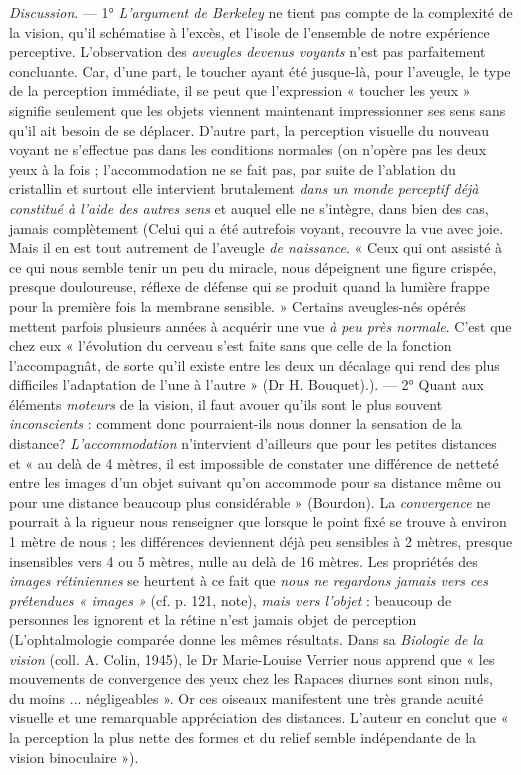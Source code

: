 {{\it Discussion}. — 1° {\it L'argument de Berkeley} ne tient pas compte de la
complexité de la vision, qu’il schématise à l'excès, et l’isole de l’ensemble
de notre expérience perceptive. L'observation des {\it aveugles devenus voyants}
n'est pas parfaitement concluante. Car, d’une part, le toucher ayant été
jusque-là, pour l’aveugle, le type de la perception immédiate, il se peut
que l'expression « toucher les yeux » signifie seulement que les objets
viennent maintenant impressionner ses sens sans qu'il ait besoin de se
déplacer. D'autre part, la perception visuelle du nouveau voyant ne s’effectue
pas dans les conditions normales (on n’opère pas les deux yeux à la fois ;
l’accommodation ne se fait pas, par suite de l’ablation du cristallin et
surtout elle intervient brutalement {\it dans un monde perceptif déjà constitué
à l’aide des autres sens} et auquel elle ne s'intègre, dans bien des cas, jamais
complètement {\scriptsize (Celui qui a été autrefois voyant, recouvre la vue
avec joie. Mais il en est tout autrement de l'aveugle {\it de naissance}. « Ceux qui
ont assisté à ce qui nous semble tenir un peu du miracle, nous dépeignent une
figure crispée, presque douloureuse, réflexe de défense qui se produit quand
la lumière frappe pour la première fois la membrane sensible. » Certains
aveugles-nés opérés mettent parfois plusieurs années à acquérir une vue {\it à peu
près normale}. C’est que chez eux « l'évolution du cerveau s'est faite sans que
celle de la fonction l’accompagnât, de sorte qu'il existe entre les deux un
décalage qui rend des plus difficiles l’adaptation de l'une à l’autre »
(Dr H. Bouquet).)}. — 2° Quant aux éléments {\it moteurs} de la vision, il faut
avouer qu’ils sont le plus souvent {\it inconscients} : comment donc pourraient-ils
nous donner la sensation de la distance? {\it L’accommodation} n'intervient
d’ailleurs que pour les petites distances et « au delà de 4 mètres, il est
impossible de constater une différence de netteté entre les images d’un objet
suivant qu’on accommode pour sa distance même ou pour une distance
beaucoup plus considérable » (Bourdon). La {\it convergence} ne pourrait à la
rigueur nous renseigner que lorsque le point fixé se trouve à environ 1 mètre
de nous ; les différences deviennent déjà peu sensibles à 2 mètres, presque
insensibles vers 4 ou 5 mètres, nulle au delà de 16 mètres. Les propriétés
des {\it images rétiniennes} se heurtent à ce fait que {\it nous ne regardons jamais
vers ces prétendues « images »} (cf. p. 121, note), {\it mais vers l'objet} : beaucoup
de personnes les ignorent et la rétine n’est jamais objet de perception
{\scriptsize (L'ophtalmologie comparée donne les mêmes résultats. Dans sa
{\it Biologie de la vision} (coll. A. Colin, 1945), le Dr Marie-Louise Verrier nous
apprend que « les mouvements de convergence des yeux chez les Rapaces diurnes
sont sinon nuls, du moins ... négligeables ». Or ces oiseaux manifestent une
très grande acuité visuelle et une remarquable appréciation des distances.
L'auteur en conclut que « la perception la plus nette des formes et du relief
semble indépendante de la vision binoculaire »)}.}
\vspace{0.31cm}


